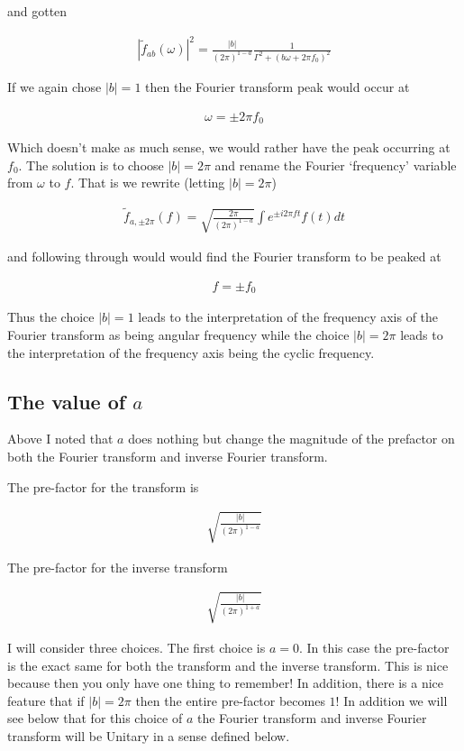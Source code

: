 \documentclass[12pt]{article}
\begin{document}
and gotten

\begin{align}
|\tilde{f}_{ab}(\omega)|^2 = \frac{|b|}{(2\pi)^{1-a}} \frac{1}{\Gamma^2 + (b\omega + 2\pi f_0)^2}
\end{align}

If we again chose $|b|=1$ then the Fourier transform peak would occur at

\begin{align}
\omega = \pm 2\pi f_0
\end{align}

Which doesn't make as much sense, we would rather have the peak occurring at $f_0$. The solution is to choose $|b| = 2\pi$ and rename the Fourier `frequency' variable from $\omega$ to $f$. That is we rewrite (letting $|b|=2\pi$)

\begin{align}
\tilde{f}_{a, \pm 2\pi}(f) = \sqrt{\frac{2\pi}{(2\pi)^{1-a}}}\int e^{\pm i 2\pi f t}f(t)dt
\end{align}

and following through would would find the Fourier transform to be peaked at

\begin{align}
f = \pm f_0
\end{align}

Thus the choice $|b| = 1$ leads to the interpretation of the frequency axis of the Fourier transform as being angular frequency while the choice $|b|=2\pi$ leads to the interpretation of the frequency axis being the cyclic frequency.

\subsection{The value of $a$}

Above I noted that $a$ does nothing but change the magnitude of the prefactor on both the Fourier transform and inverse Fourier transform.

The pre-factor for the transform is

\begin{align}
\sqrt{\frac{|b|}{(2\pi)^{1-a}}}
\end{align}

The pre-factor for the inverse transform

\begin{align}
\sqrt{\frac{|b|}{(2\pi)^{1+a}}}
\end{align}

I will consider three choices. The first choice is $a=0$. In this case the pre-factor is the exact same for both the transform and the inverse transform. This is nice because then you only have one thing to remember! In addition, there is a nice feature that if $|b|=2\pi$ then the entire pre-factor becomes $1$! In addition we will see below that for this choice of $a$ the Fourier transform and inverse Fourier transform will be Unitary in a sense defined below.
\end{document}

